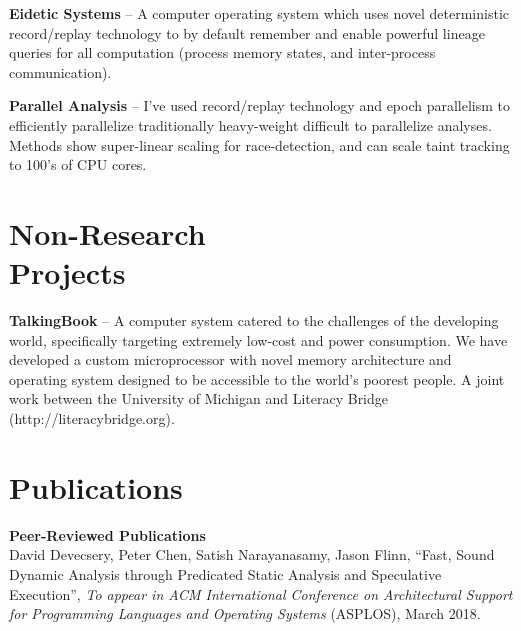 \documentclass[margin, 10pt]{res} %
\begin{document}
\begin{resume}
\textbf{Eidetic Systems} -- A computer operating system which uses
novel deterministic record/replay technology to by default remember
and enable powerful lineage queries for all computation (process
memory states, and inter-process communication).

\textbf{Parallel Analysis} -- I've used record/replay technology and
epoch parallelism to efficiently parallelize traditionally
heavy-weight difficult to parallelize analyses.  Methods show
super-linear scaling for race-detection, and can scale taint tracking
to 100's of CPU cores.



\section{Non-Research \\ Projects}
\textbf{TalkingBook} -- A computer system catered to the challenges of
the developing world, specifically targeting extremely low-cost and
power consumption.  We have developed a custom microprocessor with
novel memory architecture and operating system designed to be
accessible to the world's poorest people.  A joint work between the
University of Michigan and Literacy Bridge
(http://literacybridge.org).

\section{Publications}
\textbf{Peer-Reviewed Publications}\\
David Devecsery, Peter Chen, Satish Narayanasamy, Jason Flinn, ``Fast,
Sound Dynamic Analysis through Predicated Static Analysis and
Speculative Execution'', {\sl To appear in ACM International Conference
on Architectural Support for Programming Languages and Operating
Systems} (ASPLOS), March
2018.


\end{resume}
\end{document}
